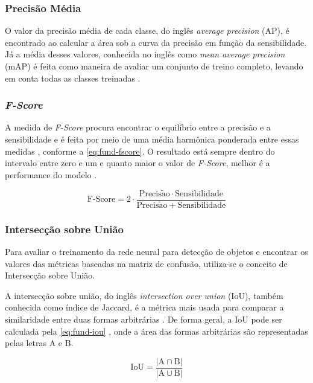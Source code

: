 \subsubsection{Precisão Média} \label{cap:fund-ia-metricas-pmed}
O valor da precisão média de cada classe, do inglês \textit{average precision} (AP), é encontrado ao calcular a área sob a curva da precisão em função da sensibilidade. Já a média desses valores, conhecida no inglês como \textit{mean average precision} (mAP) é feita como maneira de avaliar um conjunto de treino completo, levando em conta todas as classes treinadas \cite{ref:Tan}.

\subsubsection{\textit{F-Score}} \label{cap:fund-ia-metricas-fscore}
A medida de \textit{F-Score} procura encontrar o equilíbrio entre a precisão e a sensibilidade \cite{ref:Mishra} e é feita por meio de uma média harmônica ponderada entre essas medidas \cite{ref:Batarseh-Yang}, conforme a \autoref{eq:fund-fscore}. O resultado está sempre dentro do intervalo entre zero e um e quanto maior o valor de \textit{F-Score}, melhor é a performance do modelo \cite{ref:Mishra}.

\begin{equation} \label{eq:fund-fscore}
\mathrm{
  \text{F-Score} = 2 \cdot \frac{Precis\tilde{a}o \cdot Sensibilidade}{Precis\tilde{a}o + Sensibilidade}
}
\end{equation}

\subsubsection{Intersecção sobre União} \label{cap:fund-ia-metricas-iou}
Para avaliar o treinamento da rede neural para detecção de objetos e encontrar os valores das métricas baseadas na matriz de confusão, utiliza-se o conceito de Intersecção sobre União.

A intersecção sobre união, do inglês \textit{intersection over union} (IoU), também conhecida como índice de Jaccard, é a métrica mais  usada para comparar a similaridade entre duas formas arbitrárias \cite{ref:Rezatofighi-et-al}. De forma geral, a IoU pode ser calculada pela \autoref{eq:fund-iou} \cite{ref:Rezatofighi-et-al}, onde a área das formas arbitrárias são representadas pelas letras A e B.

\begin{equation} \label{eq:fund-iou}
\mathrm{
  IoU = \frac{|A \cap B|}{|A \cup B|}
}
\end{equation}

